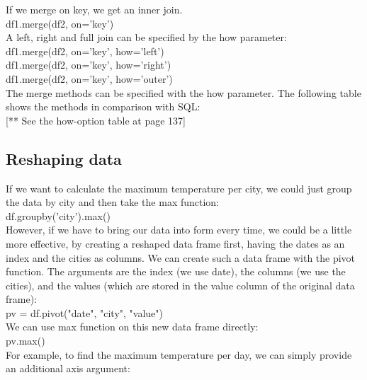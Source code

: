 \documentclass{article}
\numberwithin{equation}{section} %
\begin{document}
If we merge on key, we get an inner join. \\

df1.merge(df2, on='key') \\

A left, right and full join can be specified by the how parameter: \\

df1.merge(df2, on='key', how='left') \\

df1.merge(df2, on='key', how='right') \\

df1.merge(df2, on='key', how='outer') \\

The merge methods can be specified with the how parameter. The following table
shows the methods in comparison with SQL: \\

[** See the how-option table at page 137] \\


\subsection*{Reshaping data}

If we want to calculate the maximum temperature per city, we could just group the
data by city and then take the max function: \\

df.groupby('city').max() \\

However, if we have to bring our data into form every time, we could be a little more effective, by creating a reshaped data frame first, having the dates as an index and the cities as columns. We can create such a data frame with the pivot function. The arguments are the index (we use date), the columns (we use the cities), and the values (which are stored in the value column of the original data frame): \\

pv = df.pivot("date", "city", "value") \\

We can use max function on this new data frame directly: \\

pv.max() \\

For example, to find the maximum temperature per day, we can simply provide an additional axis argument: \\
\end{document}

